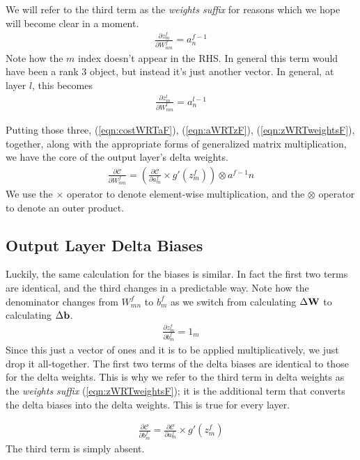 \documentclass[twocolumn]{revtex4-1}
\newcommand{\bld}[1]{\vectorbold{#1}}
\newcommand{\cC}{\mathscr{C}}
\newcommand{\parpar}[2]{\frac{\partial #1}{\partial #2}}
\begin{document}
We will refer to the third term as the \textit{weights suffix} for reasons which we hope will become clear in a moment.
\begin{align}
    \label{eqn:zWRTweightsF}
    \parpar{z^f_m}{W^f_{n m}} = a^{f-1}_n
\end{align}
Note how the $m$ index doesn't appear in the RHS. In general this term would have been a rank 3 object, but instead it's just another vector. In general, at layer $l$, this becomes
\begin{align}
    \label{eqn:zWRTweightsL}
    \parpar{z^l_m}{W^l_{n m}} = a^{l-1}_n
\end{align}

Putting those three, (\ref{eqn:costWRTaF}), (\ref{eqn:aWRTzF}), (\ref{eqn:zWRTweightsF}), together, along with the appropriate forms of generalized matrix multiplication, we have the core of the output layer's delta weights.
\begin{align}
    \label{eqn:costWRTweightsF}
    \parpar{\cC}{W^f_{n m}} = \left(\parpar{\cC}{a^f_m} \times g'(z^f_m) \right) \otimes a^{f-1}{n}
\end{align}
We use the $\times$ operator to denote element-wise multiplication, and the $\otimes$ operator to denote an outer product.


\subsection{Output Layer Delta Biases}
Luckily, the same calculation for the biases is similar. In fact the first two terms are identical, and the third changes in a predictable way. Note how the denominator changes from $W^f_{m n}$ to $b^f_m$ as we switch from calculating $\Delta \bld{W}$ to calculating $\Delta \bld{b}$.
\begin{align}
    \label{eqn:zWRTbiasesF}
    \parpar{z^f_m}{b^f_m} = 1_m
\end{align}
Since this just a vector of ones and it is to be applied multiplicatively, we just drop it all-together. The first two terms of the delta biases are identical to those for the delta weights. This is why we refer to the third term in delta weights as the \textit{weights suffix}  (\ref{eqn:zWRTweightsF}); it is the additional term that converts the delta biases into the delta weights. This is true for every layer.

\begin{align}
    \parpar{\cC}{b^f_m} = \parpar{\cC}{a^f_m} \times g'(z^f_m)
\end{align}
The third term is simply absent.
\end{document}
